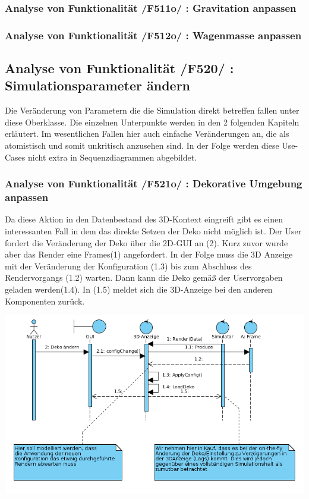 \subsubsection{Analyse von Funktionalität /F511o/ :  Gravitation anpassen}
\subsubsection{Analyse von Funktionalität /F512o/ :  Wagenmasse anpassen}
\subsection{Analyse von Funktionalität /F520/ :  Simulationsparameter ändern}
Die Veränderung von Parametern die die Simulation direkt betreffen fallen unter diese Oberklasse. Die einzelnen Unterpunkte werden in den 2 folgenden Kapiteln erläutert. Im wesentlichen Fallen hier 
auch einfache Veränderungen an, die als atomistisch und somit unkritisch anzusehen sind. In der Folge werden diese Use-Cases nicht extra in Sequenzdiagrammen abgebildet.
\subsubsection{Analyse von Funktionalität /F521o/ :  Dekorative Umgebung anpassen}
Da diese Aktion in den Datenbestand des 3D-Kontext eingreift gibt es einen interessanten Fall in dem das direkte Setzen der Deko nicht möglich ist. 
Der User fordert die Veränderung der Deko über die 2D-GUI an (2). Kurz zuvor wurde aber das Render eine Frames(1) angefordert. In der Folge muss die 3D Anzeige mit der Veränderung der Konfiguration (1.3)
bis zum Abschluss des Rendervorgangs (1.2) warten. Dann kann die Deko gemäß der Uservorgaben geladen werden(1.4). In (1.5) meldet sich die 3D-Anzeige bei den anderen Komponenten zurück. 

\includegraphics[width=16cm]{bilder/change_graphic_deko}

